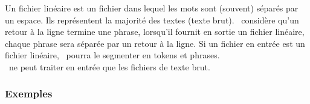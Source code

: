 \documentclass[manual-fr.tex]{subfiles}
\begin{document}
Un fichier linéaire est un fichier dans lequel les mots sont (souvent) séparés par un espace. Ils représentent la majorité des textes (texte brut).
\SEM\ considère qu'un retour à la ligne termine une phrase, lorsqu'il fournit en sortie un fichier linéaire, chaque phrase sera séparée par un retour
à la ligne. Si un fichier en entrée est un fichier linéaire, \SEM\ pourra le segmenter en tokens et phrases.\\

\SEM\ ne peut traiter en entrée que les fichiers de texte brut.

\subsubsection{Exemples}

\end{document}
